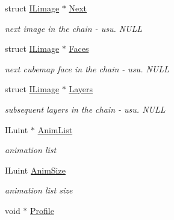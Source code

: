 \begin{DoxyCompactItemize}
\mbox{\label{structILimage_adbd033e6e25af697caa549be3deeb5ff}} 
struct \hyperlink{structILimage}{I\+Limage} $\ast$ \hyperlink{structILimage_adbd033e6e25af697caa549be3deeb5ff}{Next}
\begin{DoxyCompactList}\small\item\em next image in the chain -\/ usu. N\+U\+LL \end{DoxyCompactList}\item 
\mbox{\label{structILimage_a42b8f93f02ab5e6c9623967a08e2d013}} 
struct \hyperlink{structILimage}{I\+Limage} $\ast$ \hyperlink{structILimage_a42b8f93f02ab5e6c9623967a08e2d013}{Faces}
\begin{DoxyCompactList}\small\item\em next cubemap face in the chain -\/ usu. N\+U\+LL \end{DoxyCompactList}\item 
\mbox{\label{structILimage_a504d31f6b9c9d6da656f5eecb57bdd46}} 
struct \hyperlink{structILimage}{I\+Limage} $\ast$ \hyperlink{structILimage_a504d31f6b9c9d6da656f5eecb57bdd46}{Layers}
\begin{DoxyCompactList}\small\item\em subsequent layers in the chain -\/ usu. N\+U\+LL \end{DoxyCompactList}\item 
\mbox{\label{structILimage_ab128f3c35d0617202e3ec8252af5fa03}} 
I\+Luint $\ast$ \hyperlink{structILimage_ab128f3c35d0617202e3ec8252af5fa03}{Anim\+List}
\begin{DoxyCompactList}\small\item\em animation list \end{DoxyCompactList}\item 
\mbox{\label{structILimage_a70e6057f47ac13562d06c43e17f9be56}} 
I\+Luint \hyperlink{structILimage_a70e6057f47ac13562d06c43e17f9be56}{Anim\+Size}
\begin{DoxyCompactList}\small\item\em animation list size \end{DoxyCompactList}\item 
\mbox{\label{structILimage_a78a95799c50680f0301e83b3f09c010f}} 
void $\ast$ \hyperlink{structILimage_a78a95799c50680f0301e83b3f09c010f}{Profile}

\end{DoxyCompactItemize}
